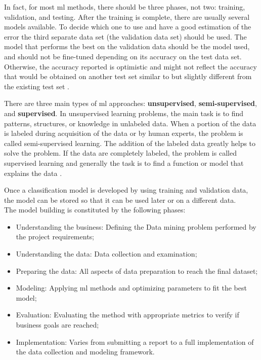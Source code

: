 In fact, for most \gls{ml} methods, there should be three phases, not two: training, validation, and testing. After the training is complete, there are usually several models available. To decide which one to use and have a good estimation of the error the third separate data set (the validation data set) should be used. The model that performs the best on the validation data should be the model used, and should not be fine-tuned depending on its accuracy on the test data set. Otherwise, the accuracy reported is optimistic and might not reflect the accuracy that would be obtained on another test set similar to but slightly different from the existing test set \cite{Anna_L2016}.

There are three main types of \gls{ml} approaches: \textbf{unsupervised}, \textbf{semi-supervised}, and \textbf{supervised}. In unsupervised learning problems, the main task is to find patterns, structures, or knowledge in unlabeled data. When a portion of the data is labeled during acquisition of the data or by human experts, the problem is called semi-supervised learning. The addition of the labeled data greatly helps to solve the problem. If the data are completely labeled, the problem is called supervised learning and generally the task is to find a function or model that explains the data \cite{Tom_M_Mitchell1997}.

Once a classification model is developed by using training and validation data, the model can be stored so that it can be used later or on a different data.\\

The model building is constituted by the following phases: 

\begin{itemize}
\item Understanding the business: Defining the Data mining problem performed by the project requirements;
\item  Understanding the data: Data collection and examination;
\item Preparing the data: All aspects of data preparation to reach the final dataset;
\item Modeling: Applying \gls{ml} methods and optimizing parameters to fit the best model;
\item Evaluation: Evaluating the method with appropriate metrics to verify if business goals are reached;
\item  Implementation: Varies from submitting a report to a full implementation of the data collection and modeling framework.
\end{itemize}

